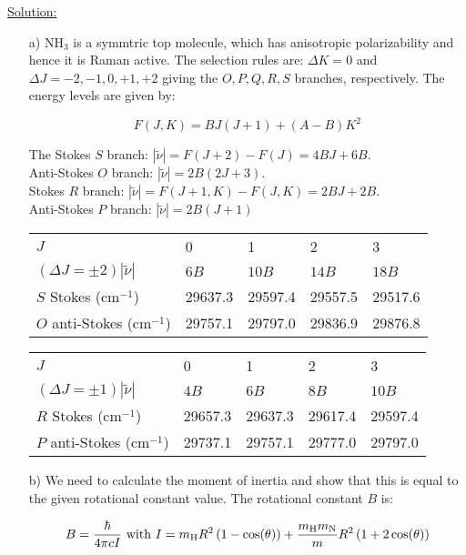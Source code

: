 \noindent
\underline{Solution:}\\

\noindent
\begin{itemize}

\item[a)] NH$_3$ is a symmtric top molecule, which has anisotropic polarizability and hence it is Raman active. The selection rules are: $\Delta K = 0$ and $\Delta J = -2, -1, 0, +1, +2$ giving the $O,P,Q,R,S$ branches, respectively. The energy levels are given by:

$$F(J,K) = BJ(J+1) + (A - B)K^2$$

\noindent
The Stokes $S$ branch: $\left|\tilde{\nu}\right| = F(J+2) - F(J) = 4BJ + 6B$.\\
Anti-Stokes $O$ branch: $\left|\tilde{\nu}\right| = 2B(2J + 3)$.\\
Stokes $R$ branch: $\left|\tilde{\nu}\right| = F(J+1,K) - F(J,K) = 2BJ + 2B$.\\
Anti-Stokes $P$ branch: $\left|\tilde{\nu}\right| = 2B(J+1)$\\

\noindent
\begin{tabular}{lllll}
$J$ & 0 & 1 & 2 & 3\\
$\left(\Delta J = \pm 2\right)\left|\tilde{\nu}\right|$ & $6B$ & $10B$ & $14B$ & $18B$\\
\cline{1-5}
$S$ Stokes (cm$^{-1}$) & 29637.3 & 29597.4 & 29557.5 & 29517.6\\
$O$ anti-Stokes (cm$^{-1}$) & 29757.1 & 29797.0 & 29836.9 & 29876.8\\
\end{tabular}

\begin{tabular}{lllll}
$J$ & 0 & 1 & 2 & 3\\
$\left(\Delta J = \pm 1\right)\left|\tilde{\nu}\right|$ & $4B$ & $6B$ & $8B$ & $10B$\\
\cline{1-5}
$R$ Stokes (cm$^{-1}$) & 29657.3 & 29637.3 & 29617.4 & 29597.4\\
$P$ anti-Stokes (cm$^{-1}$) & 29737.1 & 29757.1 & 29777.0 & 29797.0\\
\end{tabular}

\item[b)] We need to calculate the moment of inertia and show that this is equal to the given rotational constant value. The rotational constant $B$ is:

$$B = \frac{\hbar}{4\pi cI}\textnormal{ with }I = m_\textnormal{H}R^2\left(1 - \cos(\theta)\right) + \frac{m_\textnormal{H}m_\textnormal{N}}{m}R^2\left(1 + 2\cos(\theta)\right)$$


\end{itemize}

